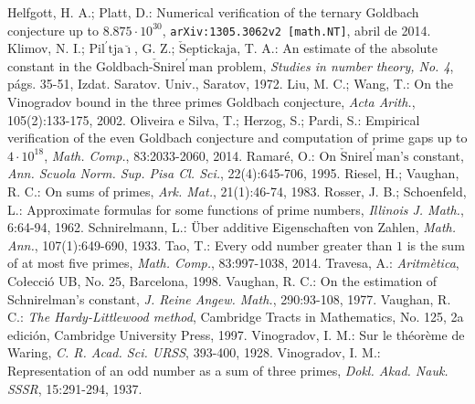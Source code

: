 \documentclass[11pt,a4paper,openright,oneside]{article}
\numberwithin{equation}{section}
\theoremstyle{definition}
\begin{document}
\begin{thebibliography}{25}
     Helfgott, H. A.; Platt, D.: Numerical verification of the ternary Goldbach conjecture up to $8.875 \cdot 10^{30}$, \texttt{arXiv:1305.3062v2 [math.NT]}, abril de 2014.
     Klimov, N. I.; $\text{Pil}^{\prime} \text{tja}\breve{\imath}$, G. Z.; $\check{\text{S}}\text{eptickaja}$, T. A.: An estimate of the absolute constant in the Goldbach-$\check{\text{S}}\text{nirel}^{\prime} \text{man}$ problem, \textit{Studies in number theory, No. 4}, p\'ags. 35-51, Izdat. Saratov. Univ., Saratov, 1972.
     Liu, M. C.; Wang, T.: On the Vinogradov bound in the three primes Goldbach conjecture, \textit{Acta Arith.}, 105(2):133-175, 2002.
     Oliveira e Silva, T.; Herzog, S.; Pardi, S.: Empirical verification of the even Goldbach conjecture and computation of prime gaps up to $4\cdot10^{18}$, \textit{Math. Comp.}, 83:2033-2060, 2014.
     Ramar\'e, O.: On $\check{\text{S}}\text{nirel}^{\prime} \text{man's}$ constant, \textit{Ann. Scuola Norm. Sup. Pisa Cl. Sci.}, 22(4):645-706, 1995.
     Riesel, H.; Vaughan, R. C.: On sums of primes, \textit{Ark. Mat.}, 21(1):46-74, 1983.
     Rosser, J. B.; Schoenfeld, L.: Approximate formulas for some functions of prime numbers, \textit{Illinois J. Math.}, 6:64-94, 1962.
     Schnirelmann, L.: \"Uber additive Eigenschaften von Zahlen, \textit{Math. Ann.}, 107(1):649-690, 1933.
     Tao, T.: Every odd number greater than $1$ is the sum of at most five primes, \textit{Math. Comp.}, 83:997-1038, 2014.
     Travesa, A.: \textit{Aritm\`etica}, Co{\l}ecci\'o UB, No. 25, Barcelona, 1998.
     Vaughan, R. C.: On the estimation of Schnirelman's constant, \textit{J. Reine Angew. Math.}, 290:93-108, 1977.
     Vaughan, R. C.: \textit{The Hardy-Littlewood method}, Cambridge Tracts in Mathematics, No. 125, 2a edici\'on, Cambridge University Press, 1997.
     Vinogradov, I. M.: Sur le th\'eor\`eme de Waring, \textit{C. R. Acad. Sci. URSS}, 393-400, 1928.
     Vinogradov, I. M.: Representation of an odd number as a sum of three primes, \textit{Dokl. Akad. Nauk. SSSR}, 15:291-294, 1937.
\end{thebibliography}
\end{document}
